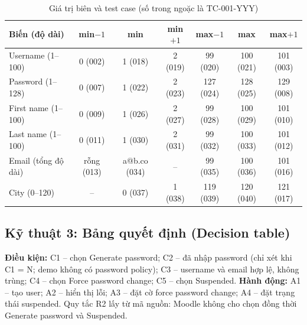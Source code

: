 \documentclass[12pt,a4paper]{article}
\begin{document}
\begin{table}[H]
\centering\footnotesize
\begin{tabular}{|l|c|c|c|c|c|c|}
\hline
\rowcolor{gray!15}\textbf{Biến (độ dài)} & \textbf{min$-1$} & \textbf{min} & \textbf{min$+1$} & \textbf{max$-1$} & \textbf{max} & \textbf{max$+1$} \\ \hline
Username (1--100) & 0 (002) & 1 (018) & 2 (019) & 99 (020) & 100 (021) & 101 (003) \\ \hline
Password (1--128) & 0 (007) & 1 (022) & 2 (023) & 127 (024) & 128 (025) & 129 (008) \\ \hline
First name (1--100) & 0 (009) & 1 (026) & 2 (027) & 99 (028) & 100 (029) & 101 (010) \\ \hline
Last name (1--100) & 0 (011) & 1 (030) & 2 (031) & 99 (032) & 100 (033) & 101 (012) \\ \hline
Email (tổng độ dài) & rỗng (013) & a@b.co (034) & -- & 99 (035) & 100 (036) & 101 (016) \\ \hline
City (0--120) & -- & 0 (037) & 1 (038) & 119 (039) & 120 (040) & 121 (017) \\ \hline
\end{tabular}
\caption{Giá trị biên và test case (số trong ngoặc là TC-001-YYY)}
\end{table}

\subsection{Kỹ thuật 3: Bảng quyết định (Decision table)}
\textbf{Điều kiện:} C1 -- chọn Generate password; C2 -- đã nhập password (chỉ xét khi C1 = N; demo không có password policy);
C3 -- username và email hợp lệ, không trùng; C4 -- chọn Force password change; C5 -- chọn Suspended.
\textbf{Hành động:} A1 -- tạo user; A2 -- hiển thị lỗi; A3 -- đặt cờ force password change; A4 -- đặt trạng thái suspended.
Quy tắc R2 lấy từ mã nguồn: Moodle không cho chọn đồng thời Generate password và Suspended.
\end{document}
